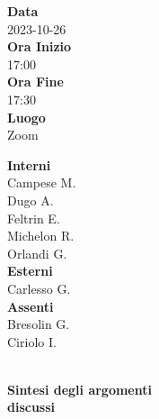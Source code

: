 \documentclass{article}
\begin{document}
\setlength{\columnsep}{2.2em}
\setlength{\columnseprule}{4pt}
\begin{paracol}{2}


\textbf{Data} \\
2023-10-26\\

\textbf{Ora Inizio} \\
17:00\\

\textbf{Ora Fine} \\
17:30\\

\textbf{Luogo} \\
Zoom

\vspace{6em}


\textbf{Interni} \\
Campese M.\\
Dugo A.\\
Feltrin E.\\
Michelon R.\\
Orlandi G.\\

\textbf{Esterni} \\
Carlesso G.\\

\textbf{Assenti} \\
Bresolin G.\\
Ciriolo I.

\newpage

\\
\textbf{Sintesi degli argomenti\\discussi}

\newpage
~ \\\\\\\\\\\\\\\\\\\\\\\\\\\\\\\\\\\\\\\\\\~


\end{paracol}
\end{document}
